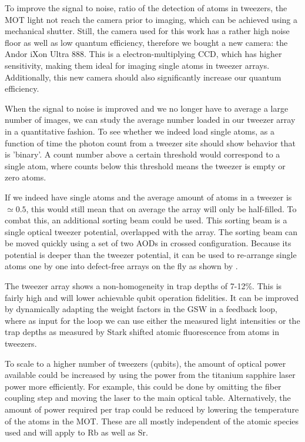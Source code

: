 \noindent To improve the signal to noise, ratio of the detection of atoms in tweezers, the MOT light not reach the camera prior to imaging, which can be achieved using a mechanical shutter. 
Still, the camera used for this work has a rather high noise floor as well as low quantum efficiency, therefore we bought a new camera: the Andor iXon Ultra 888.
This is a electron-multiplying \ac{CCD}, which has higher sensitivity, making them ideal for imaging single atoms in tweezer arrays.
Additionally, this new camera should also significantly increase our quantum efficiency.
    
When the signal to noise is improved and we no longer have to average a large number of images, we can study the average number loaded in our tweezer array in a quantitative fashion.
To see whether we indeed load single atoms, as a function of time the photon count from a tweezer site should show behavior that is 'binary'. A count number above a certain threshold would correspond to a single atom, where counts below this threshold means the tweezer is empty or zero atoms. 
    
If we indeed have single atoms and the average amount of atoms in a tweezer is $\simeq 0.5$, this would still mean that on average the array will only be half-filled.
To combat this, an additional sorting beam could be used. 
This sorting beam is a single optical tweezer potential, overlapped with the array. 
The sorting beam can be moved quickly using a set of two \ac{AOD}s in crossed configuration.
Because its potential is deeper than the tweezer potential, it can be used to re-arrange single atoms one by one into defect-free arrays on the fly as shown by \cite{Barredo2016}.

The tweezer array shows a non-homogeneity in trap depths of 7-12\%. This is fairly high and will lower achievable qubit operation fidelities.
It can be improved by dynamically adapting the weight factors in the \ac{GSW} in a feedback loop, where as input for the loop we can use either the measured light intensities or the trap depths as measured by Stark shifted atomic fluorescence from atoms in tweezers.

To scale to a higher number of tweezers (qubits), the amount of optical power available could be increased by using the power from the titanium sapphire laser power more efficiently. 
For example, this could be done by omitting the fiber coupling step and moving the laser to the main optical table. 
Alternatively, the amount of power required per trap could be reduced by lowering the temperature of the atoms in the MOT. 
These are all mostly independent of the atomic species used and will apply to Rb as well as Sr. \\

